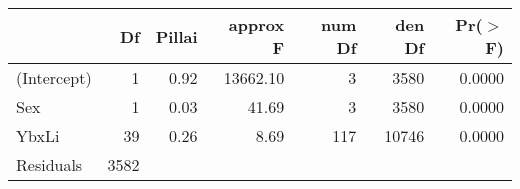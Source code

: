 \begin{table}[ht]
\label{tab:model1aov}
\centering
\begin{tabular}{lrrrrrr}
  \hline
 & Df & Pillai & approx F & num Df & den Df & Pr($>$F) \\ 
  \hline
(Intercept) & 1 & 0.92 & 13662.10 & 3 & 3580 & 0.0000 \\ 
  Sex & 1 & 0.03 & 41.69 & 3 & 3580 & 0.0000 \\ 
  YbxLi & 39 & 0.26 & 8.69 & 117 & 10746 & 0.0000 \\ 
  Residuals & 3582 &  &  &  &  &  \\ 
   \hline
\end{tabular}
\end{table}


